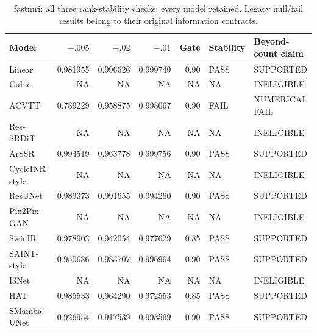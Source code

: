 \begin{table}[t]\centering\scriptsize

\caption{fastmri: all three rank-stability checks; every model retained. Legacy null/fail results belong to their original information contracts.}

\begin{tabular}{lrrrrll}\toprule Model & $+.005$ & $+.02$ & $-.01$ & Gate & Stability & Beyond-count claim\\\midrule

Linear & 0.981955 & 0.996626 & 0.999749 & 0.90 & PASS & SUPPORTED\\

Cubic & NA & NA & NA & NA & NA & INELIGIBLE\\

ACVTT & 0.789229 & 0.958875 & 0.998067 & 0.90 & FAIL & NUMERICAL FAIL\\

Res-SRDiff & NA & NA & NA & NA & NA & INELIGIBLE\\

ArSSR & 0.994519 & 0.963778 & 0.999756 & 0.90 & PASS & SUPPORTED\\

CycleINR-style & NA & NA & NA & NA & NA & INELIGIBLE\\

ResUNet & 0.989373 & 0.991655 & 0.994260 & 0.90 & PASS & SUPPORTED\\

Pix2Pix-GAN & NA & NA & NA & NA & NA & INELIGIBLE\\

SwinIR & 0.978903 & 0.942054 & 0.977629 & 0.85 & PASS & SUPPORTED\\

SAINT-style & 0.950686 & 0.983707 & 0.996964 & 0.90 & PASS & SUPPORTED\\

I3Net & NA & NA & NA & NA & NA & INELIGIBLE\\

HAT & 0.985533 & 0.964290 & 0.972553 & 0.85 & PASS & SUPPORTED\\

SMamba-UNet & 0.926954 & 0.917539 & 0.993569 & 0.90 & PASS & SUPPORTED\\

\bottomrule\end{tabular}\end{table}

